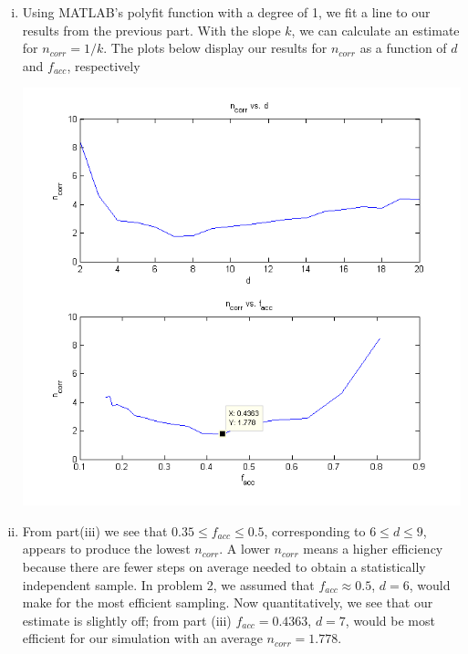 \documentclass{article}
\begin{document}
\begin{enumerate}[i.]
  \item Using MATLAB's polyfit function with a degree of 1, we fit a line to our results from the previous part. With the slope $k$, we can calculate an estimate for $n_{corr} = 1 / k$. The plots below display our results for $n_{corr}$ as a function of $d$ and $f_{acc}$, respectively
    \begin{center}
      \includegraphics[scale=0.7]{prob3c}
    \end{center}

  \item From part(iii) we see that $0.35 \leq f_{acc} \leq 0.5$, corresponding to $6 \leq d \leq 9$, appears to produce the lowest $n_{corr}$. A lower $n_{corr}$ means a higher efficiency because there are fewer steps on average needed to obtain a statistically independent sample. In problem 2, we assumed that $f_{acc} \approx 0.5$, $d=6$, would make for the most efficient sampling. Now quantitatively, we see that our estimate is slightly off; from part (iii) $f_{acc}=0.4363$, $d=7$, would be most efficient for our simulation with an average $n_{corr}=1.778$.
\end{enumerate}
\end{document}
